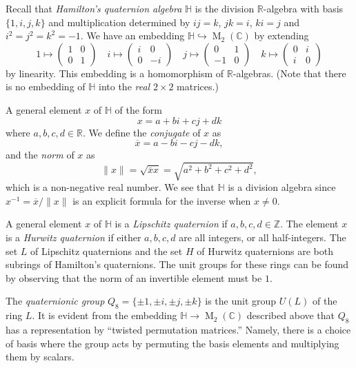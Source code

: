 \documentclass[12pt]{article}
\theoremstyle{plain}
\theoremstyle{definition}
\theoremstyle{remark}
\numberwithin{equation}{section}
\begin{document}
Recall that \emph{Hamilton's quaternion algebra} $\mathbb{H}$
is the division $\mathbb{R}$-algebra
with basis $\{1,i,j,k\}$ and multiplication determined by
$ij=k$, $jk=i$, $ki=j$ and $i^2=j^2=k^2=-1$.
We have an embedding
$\mathbb{H} \hookrightarrow \operatorname{M}_2(\mathbb{C})$
by extending
\[
1 \mapsto \begin{pmatrix} 1&0\\0&1 \end{pmatrix} \quad
i \mapsto \begin{pmatrix} i&0\\0&-i \end{pmatrix} \quad
j \mapsto \begin{pmatrix} 0&1\\-1&0 \end{pmatrix} \quad
k \mapsto \begin{pmatrix} 0&i\\i&0 \end{pmatrix}
\]
by linearity.
This embedding is a homomorphism of $\mathbb{R}$-algebras.
(Note that there is no embedding of $\mathbb{H}$ into
the \emph{real} $2\times 2$ matrices.)

A general element $x$ of $\mathbb{H}$ of the form
\[
x = a + bi + cj + dk
\]
where $a,b,c,d \in \mathbb{R}$.
We define the \emph{conjugate} of $x$ as
\[
\overline{x} = a -bi-cj-dk,
\]
and the \emph{norm} of $x$ as
\[
\|x\| = \sqrt{\overline{x} x} = \sqrt{a^2+b^2+c^2+d^2},
\]
which is a non-negative real number.
We see that $\mathbb{H}$ is a division algebra
since $x^{-1} = \overline{x}/\|x\|$ is an explicit formula for the
inverse when $x \ne 0$.

A general element $x$ of $\mathbb{H}$
is a \emph{Lipschitz quaternion} if
$a,b,c,d \in \mathbb{Z}$.
The element $x$ is a \emph{Hurwitz quaternion}
if either $a,b,c,d$ are all integers, or all half-integers.
The set $L$ of Lipschitz quaternions and the set $H$ of Hurwitz
quaternions are both subrings of Hamilton's quaternions.
The unit groups for these rings can be found by observing that the norm of
an invertible element must be $1$.

The \emph{quaternionic group} $Q_8 = \{\pm 1, \pm i, \pm j, \pm k\}$ is
the unit group $U(L)$ of the ring $L$.
It is evident from the embedding
$\mathbb{H} \to \operatorname{M}_2(\mathbb{C})$ described above
that $Q_8$ has a representation by ``twisted permutation
matrices.''
Namely, there is a choice of basis where the group acts by permuting
the basis elements and multiplying them by scalars.
\end{document}
